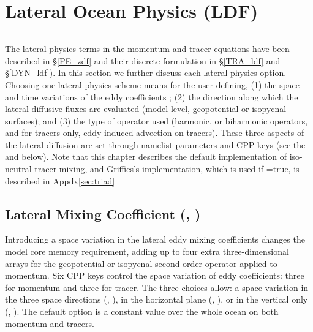 \documentclass[NEMO_book]{subfiles}
\begin{document}
\chapter{Lateral Ocean Physics (LDF)}
\label{LDF}
\minitoc


\newpage
$\ $\newline    %


The lateral physics terms in the momentum and tracer equations have been 
described in \S\ref{PE_zdf} and their discrete formulation in \S\ref{TRA_ldf} 
and \S\ref{DYN_ldf}). In this section we further discuss each lateral physics option. 
Choosing one lateral physics scheme means for the user defining, (1) the space 
and time variations of the eddy coefficients ; (2) the direction along which the 
lateral diffusive fluxes are evaluated (model level, geopotential or isopycnal 
surfaces); and (3) the type of operator used (harmonic, or biharmonic operators, 
and for tracers only, eddy induced advection on tracers). These three aspects 
of the lateral diffusion are set through namelist parameters and CPP keys 
(see the \textit{} and \textit{} below). Note
that this chapter describes the default implementation of iso-neutral
tracer mixing, and Griffies's implementation, which is used if
=true, is described in Appdx\ref{sec:triad}



\section [Lateral Mixing Coefficient (\textit{ldftra}, \textit{ldfdyn})] 
		  {Lateral Mixing Coefficient (, ) }
\label{LDF_coef}


Introducing a space variation in the lateral eddy mixing coefficients changes 
the model core memory requirement, adding up to four extra three-dimensional 
arrays for the geopotential or isopycnal second order operator applied to 
momentum. Six CPP keys control the space variation of eddy coefficients: 
three for momentum and three for tracer. The three choices allow: 
a space variation in the three space directions (,  ), 
in the horizontal plane (,  ), 
or in the vertical only (,  ). 
The default option is a constant value over the whole ocean on both momentum and tracers. 
   
\end{document}
